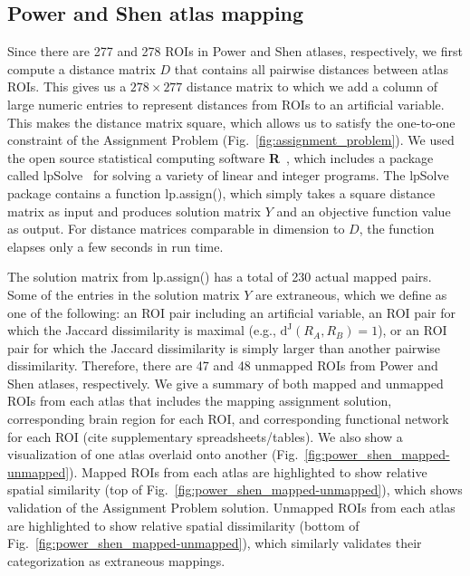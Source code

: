 \documentclass[10pt,letterpaper]{article}\usepackage[]{graphicx}\usepackage[]{color}
\begin{document}
\subsection{Power and Shen atlas mapping}
Since there are 277 and 278 ROIs in Power and Shen atlases, respectively, we first compute a distance matrix $D$ that contains all pairwise distances between atlas ROIs. This gives us a $278 \times 277$ distance matrix to which we add a column of large numeric entries to represent distances from ROIs to an artificial variable. This makes the distance matrix square, which allows us to satisfy the one-to-one constraint of the Assignment Problem (Fig.~\ref{fig:assignment_problem}). We used the open source statistical computing software \textbf{\textsf{R}}~\cite{R}, which includes a package called \textsf{lpSolve}~\cite{lpsolve} for solving a variety of linear and integer programs. The \textsf{lpSolve} package contains a function \textsf{lp.assign()}, which simply takes a square distance matrix as input and produces solution matrix $Y$ and an objective function value as output. For distance matrices comparable in dimension to $D$, the function elapses only a few seconds in run time.

The solution matrix from \textsf{lp.assign()} has a total of 230 actual mapped pairs. Some of the entries in the solution matrix $Y$ are extraneous, which we define as one of the following: an ROI pair including an artificial variable, an ROI pair for which the Jaccard dissimilarity is maximal (e.g., $\text{d}^\text{J}(R_A,R_B)=1$), or an ROI pair for which the Jaccard dissimilarity is simply larger than another pairwise dissimilarity. Therefore, there are 47 and 48 unmapped ROIs from Power and Shen atlases, respectively. We give a summary of both mapped and unmapped ROIs from each atlas that includes the mapping assignment solution, corresponding brain region for each ROI, and corresponding functional network for each ROI (cite supplementary spreadsheets/tables). We also show a visualization of one atlas overlaid onto another (Fig.~\ref{fig:power_shen_mapped-unmapped}). Mapped ROIs from each atlas are highlighted to show relative spatial similarity (top of Fig.~\ref{fig:power_shen_mapped-unmapped}), which shows validation of the Assignment Problem solution. Unmapped ROIs from each atlas are highlighted to show relative spatial dissimilarity (bottom of Fig.~\ref{fig:power_shen_mapped-unmapped}), which similarly validates their categorization as extraneous mappings.
\end{document}
